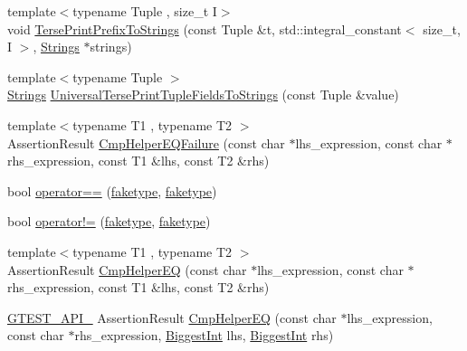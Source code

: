\begin{DoxyCompactItemize}
\item 
{\footnotesize template$<$typename Tuple , size\+\_\+t I$>$ }\\void \hyperlink{namespacetesting_1_1internal_ab244273c02742a3fac45cc241befc536}{Terse\+Print\+Prefix\+To\+Strings} (const Tuple \&t, std\+::integral\+\_\+constant$<$ size\+\_\+t, I $>$, \hyperlink{namespacetesting_1_1internal_a50003bb76ec2934be1062be11efba8bf}{Strings} $\ast$strings)
\item 
{\footnotesize template$<$typename Tuple $>$ }\\\hyperlink{namespacetesting_1_1internal_a50003bb76ec2934be1062be11efba8bf}{Strings} \hyperlink{namespacetesting_1_1internal_a7e60d1478b074801c766eeee9be6c772}{Universal\+Terse\+Print\+Tuple\+Fields\+To\+Strings} (const Tuple \&value)
\item 
{\footnotesize template$<$typename T1 , typename T2 $>$ }\\Assertion\+Result \hyperlink{namespacetesting_1_1internal_a1def8ec9393360a1b34a20528703e7f7}{Cmp\+Helper\+E\+Q\+Failure} (const char $\ast$lhs\+\_\+expression, const char $\ast$rhs\+\_\+expression, const T1 \&lhs, const T2 \&rhs)
\item 
bool \hyperlink{namespacetesting_1_1internal_a5e3e473798de3189e9343132bcfd4fea}{operator==} (\hyperlink{structtesting_1_1internal_1_1faketype}{faketype}, \hyperlink{structtesting_1_1internal_1_1faketype}{faketype})
\item 
bool \hyperlink{namespacetesting_1_1internal_afa44fdec84edfc155ef63e4f0d4287cc}{operator!=} (\hyperlink{structtesting_1_1internal_1_1faketype}{faketype}, \hyperlink{structtesting_1_1internal_1_1faketype}{faketype})
\item 
{\footnotesize template$<$typename T1 , typename T2 $>$ }\\Assertion\+Result \hyperlink{namespacetesting_1_1internal_a4638c74d9b32e971f9b321af6fafc2f1}{Cmp\+Helper\+EQ} (const char $\ast$lhs\+\_\+expression, const char $\ast$rhs\+\_\+expression, const T1 \&lhs, const T2 \&rhs)
\item 
\hyperlink{gtest-port_8h_aa73be6f0ba4a7456180a94904ce17790}{G\+T\+E\+S\+T\+\_\+\+A\+P\+I\+\_\+} Assertion\+Result \hyperlink{namespacetesting_1_1internal_a1edf90480571c0659a39d13e3777d9ce}{Cmp\+Helper\+EQ} (const char $\ast$lhs\+\_\+expression, const char $\ast$rhs\+\_\+expression, \hyperlink{namespacetesting_1_1internal_a05c6bd9ede5ccdf25191a590d610dcc6}{Biggest\+Int} lhs, \hyperlink{namespacetesting_1_1internal_a05c6bd9ede5ccdf25191a590d610dcc6}{Biggest\+Int} rhs)
\item 

\end{DoxyCompactItemize}

